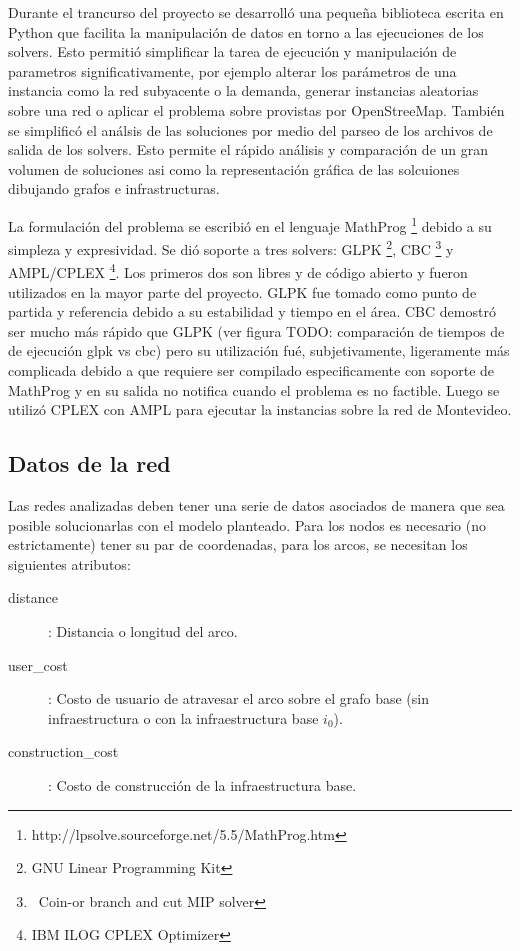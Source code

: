 \documentclass{article}
\begin{document}
  Durante el trancurso del proyecto se desarrolló una pequeña biblioteca escrita en Python que facilita la manipulación de datos en torno a las ejecuciones de los solvers. Esto permitió simplificar la tarea de ejecución y manipulación de parametros significativamente, por ejemplo alterar los parámetros de una instancia como la red subyacente o la demanda, generar instancias aleatorias sobre una red o aplicar el problema sobre provistas por OpenStreeMap. También se simplificó el análsis de las soluciones por medio del parseo de los archivos de salida de los solvers. Esto permite el rápido análisis y comparación de un gran volumen de soluciones asi como la representación gráfica de las solcuiones dibujando grafos e infrastructuras.

  La formulación del problema se escribió en el lenguaje MathProg \footnote{http://lpsolve.sourceforge.net/5.5/MathProg.htm} debido a su simpleza y expresividad. Se dió soporte a tres solvers: GLPK \footnote{GNU Linear Programming Kit}, CBC \footnote{\ Coin-or branch and cut MIP solver} y AMPL/CPLEX \footnote{IBM ILOG CPLEX Optimizer}. Los primeros dos son libres y de código abierto y fueron utilizados en la mayor parte del proyecto. GLPK fue tomado como punto de partida y referencia debido a su estabilidad y tiempo en el área. CBC demostró ser mucho más rápido que GLPK (ver figura TODO: comparación de tiempos de de ejecución glpk vs cbc) pero su utilización fué, subjetivamente, ligeramente más complicada debido a que requiere ser compilado especificamente con soporte de MathProg y en su salida no notifica cuando el problema es no factible. Luego se utilizó CPLEX con AMPL para ejecutar la instancias sobre la red de Montevideo.

  \subsection*{Datos de la red}

  Las redes analizadas deben tener una serie de datos asociados de manera que sea posible solucionarlas con el modelo planteado. Para los nodos es necesario (no estrictamente) tener su par de coordenadas, para los arcos, se necesitan los siguientes atributos:

  \begin{description}
    \item[distance]: Distancia o longitud del arco.
    \item[user\_cost]: Costo de usuario de atravesar el arco sobre el grafo base (sin infraestructura o con la infraestructura base $i_0$).
    \item[construction\_cost]: Costo de construcción de la infraestructura base.
  \end{description}
\end{document}

